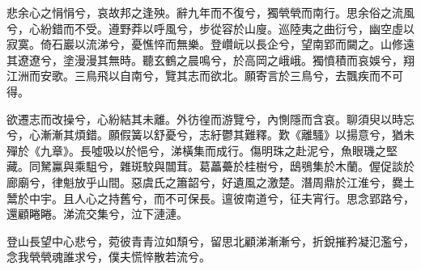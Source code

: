
\begin{pinyinscope}
悲余心之悁悁兮，哀故邦之逢殃。辭九年而不復兮，獨煢煢而南行。思余俗之流風兮，心紛錯而不受。遵野莽以呼風兮，步從容於山廋。巡陸夷之曲衍兮，幽空虛以寂寞。倚石巖以流涕兮，憂憔悴而無樂。登巑岏以長企兮，望南郢而闚之。山修遠其遼遼兮，塗漫漫其無時。聽玄鶴之晨鳴兮，於高岡之峨峨。獨憤積而哀娛兮，翔江洲而安歌。三鳥飛以自南兮，覽其志而欲北。願寄言於三鳥兮，去飄疾而不可得。

欲遷志而改操兮，心紛結其未離。外彷徨而游覽兮，內惻隱而含哀。聊須臾以時忘兮，心漸漸其煩錯。願假簧以舒憂兮，志紆鬱其難釋。歎《離騷》以揚意兮，猶未殫於《九章》。長噓吸以於悒兮，涕橫集而成行。傷明珠之赴泥兮，魚眼璣之堅藏。同駑鸁與乘駔兮，雜斑駮與闒茸。葛藟虆於桂樹兮，鴟鴞集於木蘭。偓促談於廊廟兮，律魁放乎山間。惡虞氏之簫韶兮，好遺風之激楚。潛周鼎於江淮兮，爨土鬵於中宇。且人心之持舊兮，而不可保長。邅彼南道兮，征夫宵行。思念郢路兮，還顧睠睠。涕流交集兮，泣下漣漣。

登山長望中心悲兮，菀彼青青泣如頹兮，留思北顧涕漸漸兮，折銳摧矜凝氾濫兮，念我煢煢魂誰求兮，僕夫慌悴散若流兮。


\end{pinyinscope}